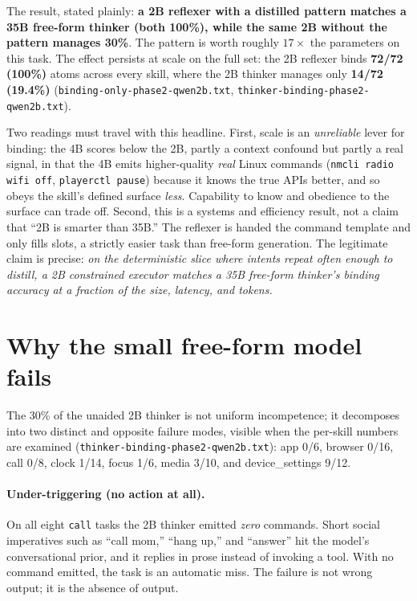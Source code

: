 The result, stated plainly: \textbf{a 2B reflexer with a distilled pattern
matches a 35B free-form thinker (both 100\%), while the same 2B without the
pattern manages 30\%}. The pattern is worth roughly $17\times$ the parameters on
this task. The effect persists at scale on the full set: the 2B reflexer binds
\textbf{72/72 (100\%)} atoms across every skill, where the 2B thinker manages
only \textbf{14/72 (19.4\%)} (\texttt{binding-only-phase2-qwen2b.txt},
\texttt{thinker-binding-phase2-qwen2b.txt}).

Two readings must travel with this headline. First, scale is an \emph{unreliable}
lever for binding: the 4B scores below the 2B, partly a context confound but
partly a real signal, in that the 4B emits higher-quality \emph{real} Linux
commands (\texttt{nmcli radio wifi off}, \texttt{playerctl pause}) because it knows
the true APIs better, and so obeys the skill's defined surface \emph{less}.
Capability to know and obedience to the surface can trade off. Second, this is a
systems and efficiency result, not a claim that ``2B is smarter than 35B.'' The
reflexer is handed the command template and only fills slots, a strictly easier
task than free-form generation. The legitimate claim is precise: \emph{on the
deterministic slice where intents repeat often enough to distill, a 2B constrained
executor matches a 35B free-form thinker's binding accuracy at a fraction of the
size, latency, and tokens.}

\section{Why the small free-form model fails}
\label{sec:p2}

The 30\% of the unaided 2B thinker is not uniform incompetence; it decomposes
into two distinct and opposite failure modes, visible when the per-skill numbers
are examined (\texttt{thinker-binding-phase2-qwen2b.txt}): app 0/6, browser
0/16, call 0/8, clock 1/14, focus 1/6, media 3/10, and device\_settings 9/12.

\paragraph{Under-triggering (no action at all).} On all eight \texttt{call}
tasks the 2B thinker emitted \emph{zero} commands. Short social imperatives such as
``call mom,'' ``hang up,'' and ``answer'' hit the model's conversational prior, and
it replies in prose instead of invoking a tool. With no command emitted, the task
is an automatic miss. The failure is not wrong output; it is the absence of
output.

